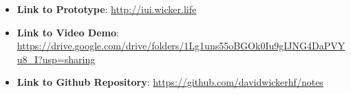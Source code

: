 \documentclass[a4paper, 12pt]{article}
\begin{document}
\begin{itemize}
    \item \textbf{Link to Prototype}: \url{http://iui.wicker.life}
    \item \textbf{Link to Video Demo}: \url{https://drive.google.com/drive/folders/1Lg1uns55oBGOk0Iu9gIJNG4DaPVYu8_I?usp=sharing}
    \item \textbf{Link to Github Repository}: \url{https://github.com/davidwickerhf/notes}
\end{itemize}
\end{document}
